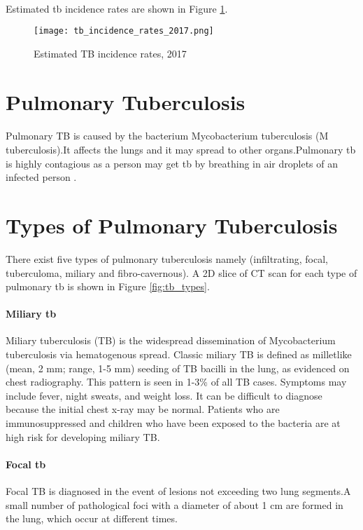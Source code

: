 \paragraph{}
Estimated \ac{tb} incidence rates are shown in Figure \ref{tb_incidence_rates_2017}.
\begin{figure}[ht]
 \texttt{[image: tb\_incidence\_rates\_2017.png]}
 \caption{Estimated TB incidence rates, 2017 \cite{TBT:3}}
 \label{tb_incidence_rates_2017}
\end{figure}
\section{Pulmonary Tuberculosis}
\paragraph{}
Pulmonary TB is caused by the bacterium Mycobacterium tuberculosis (M tuberculosis).It affects the lungs and it may spread to other organs.Pulmonary \ac{tb} is highly contagious as a person may get \ac{tb} by breathing in air droplets of an infected person \cite{TBT:4}.
\section{Types of Pulmonary Tuberculosis}
There exist five types of pulmonary tuberculosis namely (infiltrating, focal, tuberculoma, miliary and fibro-cavernous). A 2D slice of CT scan for each type of pulmonary \ac{tb} is shown in Figure \ref{fig:tb_types}.
\paragraph{Miliary \ac{tb}}
Miliary tuberculosis (TB) is the widespread dissemination of Mycobacterium tuberculosis via hematogenous spread. Classic miliary TB is defined as milletlike (mean, 2 mm; range, 1-5 mm) seeding of TB bacilli in the lung, as evidenced on chest radiography. This pattern is seen in 1-3\% of all TB cases.
Symptoms may include fever, night sweats, and weight loss. It can be difficult to diagnose because the initial chest x-ray may be normal. Patients who are immunosuppressed and children who have been exposed to the bacteria are at high risk for developing miliary TB.\cite{TBMIL:1,TBMIL:2,TBMIL:3, TBMIL:4}
\paragraph{Focal \ac{tb}}
Focal TB is diagnosed in the event of lesions not exceeding two lung segments.A small number of pathological foci with a diameter of about 1 cm are formed in the lung, which occur at different times.\cite{TBFOC:1}
